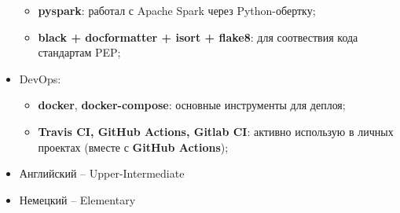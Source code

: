\begin{itemize}
\begin{itemize}
            \item \textbf{pyspark}: работал с Apache Spark через Python-обертку;
            \item \textbf{black + docformatter + isort + flake8}: для соотвествия кода стандартам PEP;
        \end{itemize}
    \item DevOps:
        \begin{itemize}
            \item \textbf{docker}, \textbf{docker-compose}: основные инструменты для деплоя;
            \item \textbf{Travis CI, GitHub Actions, Gitlab CI}: активно использую в личных проектах (вместе с \textbf{GitHub Actions});
        \end{itemize}
\end{itemize}








\begin{itemize}
	\item Английский -- Upper-Intermediate
    \item Немецкий -- Elementary
\end{itemize}

